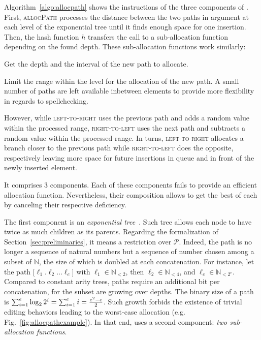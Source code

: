 Algorithm~\ref{algo:allocpath} shows the instructions of the three components of
\LSEQ. First, \textsc{allocPath} processes the distance between the two paths in
argument at each level of the exponential tree until it finds enough space for
one insertion.  Then, the hash function $h$ transfers the call to a
sub-allocation function depending on the found depth. These sub-allocation
functions work similarly:
\begin{inparaenum}[(i)]
\item Get the depth and the interval of the new path to allocate.
\item Limit the range within the level for the allocation of the new path. A
  small number of paths are left available inbetween elements to provide more
  flexibility in regards to spellchecking.
\item However, while \textsc{left-to-right} uses the previous path and adds a
  random value within the processed range, \textsc{right-to-left} uses the next
  path and subtracts a random value within the processed range. In turns,
  \textsc{left-to-right} allocates a branch closer to the previous path while
  \textsc{right-to-left} does the opposite, respectively leaving more space for
  future insertions in queue and in front of the newly inserted element.
\end{inparaenum}




It comprises 3 components. Each of these components fails to provide an
efficient allocation function. Nevertheless, their composition allows to get the
best of each by canceling their respective deficiency.

The first component is an \emph{exponential
  tree}~\cite{andersson1996faster,andersson2007dynamic}. Such tree allows each
node to have twice as much children as its parents. Regarding the formalization
of Section~\ref{sec:preliminaries}, it means a restriction over
$\mathcal{P}$. Indeed, the path is no longer a sequence of natural numbers but a
sequence of number chosen among a subset of $\mathbb{N}$, the size of which is
doubled at each concatenation. For instance, let the path
[$\ell_1.\ell_2\ldots\ell_e$] with $\ell_1\in\mathbb{N}_{<2}$, then
$\ell_2\in \mathbb{N}_{<4}$, and $\ell_{e}\in\mathbb{N}_{<2^e}$. Compared to
constant arity trees, paths require an additional bit per concatenation, for the
subset are growing over depths. The binary size of a path is
$\textstyle\sum\nolimits_{i=1}^{e}\log_2{2^i}=\sum\nolimits_{i=1}^{e}i=
{e^2-e\over{2}}$.
Such growth forbids the existence of trivial editing behaviors leading to the
worst-case allocation (e.g. Fig.~\ref{fig:allocpathexample}). In that end, \LSEQ
uses a second component: \emph{two sub-allocation functions}.

